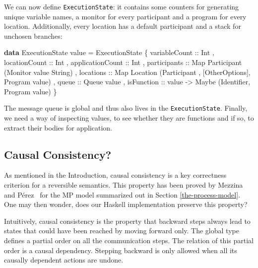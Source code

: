 \documentclass[runningheads,plain]{llncs}
\newenvironment{Shaded}{}{}
\newcommand{\KeywordTok}[1]{\textcolor[rgb]{0.00,0.44,0.13}{\textbf{#1}}}
\newcommand{\DataTypeTok}[1]{\textcolor[rgb]{0.56,0.13,0.00}{#1}}
\newcommand{\OtherTok}[1]{\textcolor[rgb]{0.00,0.44,0.13}{#1}}
\newcommand{\FunctionTok}[1]{\textcolor[rgb]{0.02,0.16,0.49}{#1}}
\newcommand{\NormalTok}[1]{#1}
\begin{document}
\noindent We can now define \texttt{ExecutionState}: it contains some counters for
generating unique variable names, a monitor for every participant and a
program for every location. Additionally, every location has a default
participant and a stack for unchosen branches:

\begin{Shaded}
\begin{Highlighting}[]
\KeywordTok{data} \DataTypeTok{ExecutionState}\NormalTok{ value }\FunctionTok{=} 
    \DataTypeTok{ExecutionState} 
\NormalTok{        \{}\OtherTok{ variableCount ::} \DataTypeTok{Int}
\NormalTok{        ,}\OtherTok{ locationCount ::} \DataTypeTok{Int}
\NormalTok{        ,}\OtherTok{ applicationCount ::} \DataTypeTok{Int}
\NormalTok{        ,}\OtherTok{ participants ::} \DataTypeTok{Map} \DataTypeTok{Participant}\NormalTok{ (}\DataTypeTok{Monitor}\NormalTok{ value }\DataTypeTok{String}\NormalTok{)}
\NormalTok{        ,}\OtherTok{ locations ::} \DataTypeTok{Map} \DataTypeTok{Location} 
\NormalTok{                 (}\DataTypeTok{Participant}\NormalTok{ , [}\DataTypeTok{OtherOptions}\NormalTok{], }\DataTypeTok{Program}\NormalTok{ value)}
\NormalTok{        ,}\OtherTok{ queue ::} \DataTypeTok{Queue}\NormalTok{ value}
\NormalTok{        ,}\OtherTok{ isFunction ::}\NormalTok{ value }\OtherTok{->} \DataTypeTok{Maybe}\NormalTok{ (}\DataTypeTok{Identifier}\NormalTok{, }\DataTypeTok{Program}\NormalTok{ value)}
\NormalTok{        \}}
\end{Highlighting}
\end{Shaded}

The message queue is global and thus also lives in the
\texttt{ExecutionState}. Finally, we need a way of inspecting values, to
see whether they are functions and if so, to extract their bodies for
application.

\subsection{Causal Consistency?}\label{properties-of-reversibility}
As mentioned in the Introduction, causal consistency is a key correctness criterion for a reversible semantics. This property has been proved by Mezzina and P\'{e}rez~\cite{DBLP:conf/ppdp/MezzinaP17} for the MP model summarized out in Section \ref{the-process-model}. One may then wonder, does our Haskell implementation preserve this property? 

Intuitively, causal consistency is the property that backward steps always lead to states that 
could have been reached by moving forward only.
The global type defines a partial order on all the communication steps.
The relation of this partial order is a causal dependency. Stepping
backward is only allowed when all its causally dependent actions are
undone. 
\end{document}
